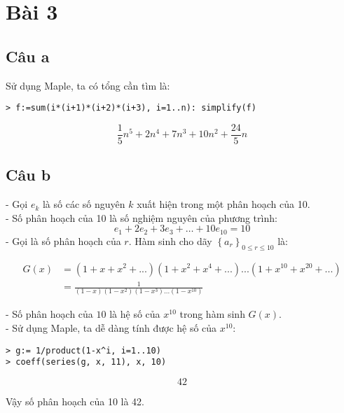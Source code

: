 \documentclass[main.tex]{subfiles}
\begin{document}
\section{Bài 3}
\subsection{Câu a}
Sử dụng Maple, ta có tổng cần tìm là:
\begin{verbatim}
> f:=sum(i*(i+1)*(i+2)*(i+3), i=1..n): simplify(f)
\end{verbatim}
$$
\frac{1}{5}n^5 + 2n^4 + 7n^3 + 10n^2 + \frac{24}{5}n
$$

\subsection{Câu b}
- Gọi $e_k$ là số các số nguyên $k$ xuất hiện trong một phân hoạch của 10.\\
- Số phân hoạch của 10 là số nghiệm nguyên của phương trình:
$$
e_1 + 2e_2 + 3e_3 + \dots + 10e_{10} = 10
$$
- Gọi  là số phân hoạch của $r$. Hàm sinh cho dãy $\left\{a_r\right\}_{0\le r \le 10}$ là:

\begin{align*}
G(x) &= (1+x+x^2+...)(1+x^2+x^4+...)...(1+x^{10}+x^{20}+...)\\
&= \frac{1}{(1-x)(1-x^2)(1-x^3)...(1-x^{10})}
\end{align*}

- Số phân hoạch của $10$ là hệ số của $x^{10}$ trong hàm sinh $G(x)$.\\
- Sử dụng Maple, ta dễ dàng tính được hệ số của $x^{10}$:
\begin{verbatim}
> g:= 1/product(1-x^i, i=1..10)
> coeff(series(g, x, 11), x, 10)
\end{verbatim}
$$
42
$$

Vậy số phân hoạch của 10 là 42.
\end{document}
